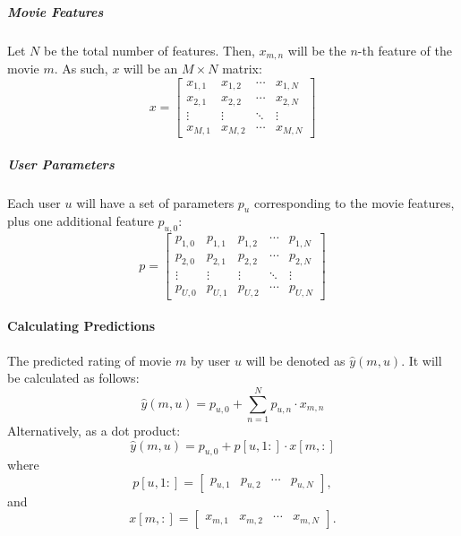 \documentclass[a4paper,9pt]{article}
\begin{document}
\subparagraph{Movie Features}
Let \( N \) be the total number of features. Then, \( x_{m,n} \) will be the \( n \)-th feature of the movie \( m \). As such, \( x \) will be an \( M \times N \) matrix:
\begin{equation}
	x =
	\begin{bmatrix}
		x_{1,1} & x_{1,2} & \cdots & x_{1,N} \\
		x_{2,1} & x_{2,2} & \cdots & x_{2,N} \\
		\vdots  & \vdots  & \ddots & \vdots  \\
		x_{M,1} & x_{M,2} & \cdots & x_{M,N}
	\end{bmatrix} \tag{5}
\end{equation}

\subparagraph{User Parameters}
Each user \( u \) will have a set of parameters \( p_u \) corresponding to the movie features, plus one additional feature \( p_{u,0} \):
\begin{equation}
	p =
	\begin{bmatrix}
		p_{1,0} & p_{1,1} & p_{1,2} & \cdots & p_{1,N} \\
		p_{2,0} & p_{2,1} & p_{2,2} & \cdots & p_{2,N} \\
		\vdots  & \vdots  & \vdots  & \ddots & \vdots  \\
		p_{U,0} & p_{U,1} & p_{U,2} & \cdots & p_{U,N}
	\end{bmatrix} \tag{6}
\end{equation}

\paragraph{Calculating Predictions}
The predicted rating of movie \( m \) by user \( u \) will be denoted as \( \hat{y}(m,u) \). It will be calculated as follows:
\begin{equation}
	\hat{y}(m,u) = p_{u,0} + \sum_{n=1}^N p_{u,n} \cdot x_{m,n} \tag{7}
\end{equation}
Alternatively, as a dot product:
\begin{equation}
	\hat{y}(m,u) = p_{u,0} + p[u,1:] \cdot x[m,:] \tag{8}
\end{equation}
where
\begin{equation}
	p[u,1:] = \begin{bmatrix}
		p_{u,1} & p_{u,2} & \cdots & p_{u,N}
	\end{bmatrix}, \tag{9}
\end{equation}
and
\begin{equation}
	x[m,:] = \begin{bmatrix}
		x_{m,1} & x_{m,2} & \cdots & x_{m,N}
	\end{bmatrix}. \tag{10}
\end{equation}
\end{document}

